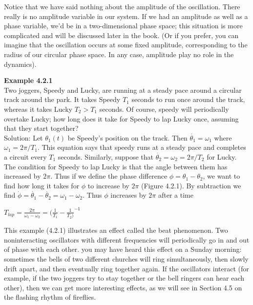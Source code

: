 \documentclass{article}
\newcommand\tab[1][1cm]{\hspace*{#1}}
\begin{document}
Notice that we have said nothing about the amplitude of the oscillation. There really is no amplitude variable in our system. If we had an amplitude as well as a phase variable, we'd be in a two-dimensional phase space; this situation is more complicated and will be discussed later in the book. (Or if you prefer, you can imagine that the oscillation occurs at some fixed amplitude, corresponding to the radius of our circular phase space. In any case, amplitude play no role in the dynamics).

\textbf {Example 4.2.1} \\ \tab
Two joggers, Speedy and Lucky, are running at a steady pace around a circular track around the park. It takes Speedy $T_{1}$ seconds to run once around the track, whereas it takes Lucky $T_{2}>T_{1}$ seconds. Of course, speedy will periodically overtake Lucky; how long does it take for Speedy to lap Lucky once, assuming that they start together? \\ \tab
Solution: Let $\theta_{1}(t)$ be Speedy's position on the track. Then $\dot{\theta_{1}}=\omega_{1}$ where $\omega_{1}=2\pi/T_{1}$. This equation says that speedy runs at a steady pace and completes a circuit every $T_{1}$ seconds. Similarly, suppose that $\dot{\theta_{2}}=\omega_{2}=2\pi/T_{2}$ for Lucky. \\ \tab
The condition for Speedy to lap Lucky is that the angle between them has increased by $2\pi$. Thus if we define the phase difference $\phi=\theta_{1}-\theta_{2}$, we want to find how long it takes for $\phi$ to increase by $2\pi$ (Figure 4.2.1). By subtraction we find $\dot{\phi}=\dot{\theta_{1}}-\dot{\theta_{2}}=\omega_{1}-\omega_{2}$. Thus $\phi$ increases by $2\pi$ after a time 
\begin{center}
$T_{lap}=\frac{2\pi}{\omega_{1}-\omega_{2}}=({\frac{1}{T_{1}}} - {\frac{1}{T_{2})}}^{-1}$
\end{center}
This example (4.2.1) illustrates an effect called the beat phenomenon. Two noninteracting oscillators with different frequencies will periodically go in and out of phase with each other. you may have heard this effect on a Sunday morning: sometimes the bells of two different churches will ring simultaneously, then slowly drift apart, and then eventually ring together again. If the oscillators interact (for example, if the two joggers try to stay together or the bell ringers can hear each other), then we can get more interesting effects, as we will see in Section 4.5 on the flashing rhythm of fireflies. 
\end{document}

